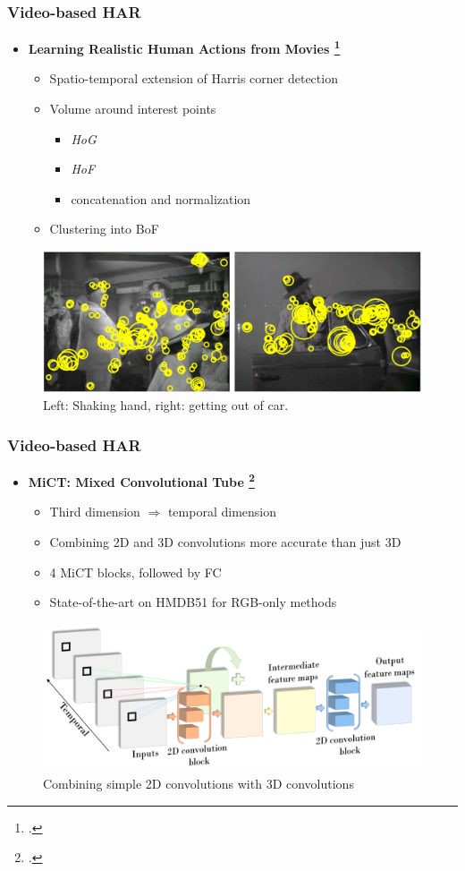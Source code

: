 \documentclass[9pt]{beamer}
\providecommand{\fcite}[1]{\footcite{#1}}
\newenvironment{myframe}[1][]{%
\begin{frame}%
\frametitle{#1}
\setcounter{footnote}{0}


}{%
\end{frame}%
}
\begin{document}
\begin{myframe}[Video-based HAR]
	\begin{itemize}
		\item \textbf{Learning Realistic Human Actions from Movies \fcite{laptev_learning_2008}}
		\begin{itemize}
			\item Spatio-temporal extension of Harris corner detection
			\item Volume around interest points
			\begin{itemize}
				\item \textit{HoG}
				\item \textit{HoF}
				\item concatenation and normalization
			\end{itemize}
			\item Clustering into BoF
		\end{itemize}
	\end{itemize}
	\begin{figure}
		\includegraphics[width=.7\textwidth]{spacetimeinterestpoints.png}
		\caption{Left: Shaking hand, right: getting out of car.}
	\end{figure}
\end{myframe}

\begin{myframe}[Video-based HAR]
	\begin{itemize}
		\item \textbf{MiCT: Mixed Convolutional Tube \fcite{zhou_mict:_2018}}
		\begin{itemize}
			\item Third dimension $\Rightarrow$ temporal dimension
			\item Combining 2D and 3D convolutions more accurate than just 3D
			\item 4 MiCT blocks, followed by FC
			\item State-of-the-art on HMDB51 for RGB-only methods
		\end{itemize}
	\end{itemize}
	\begin{figure}
		\includegraphics[width=.7\textwidth]{mict-block.png}
		\caption{Combining simple 2D convolutions with 3D convolutions}
	\end{figure}
\end{myframe}
\end{document}
